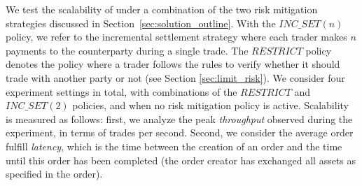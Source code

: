 We test the scalability of \ModelName{} under a combination of the two risk mitigation strategies discussed in Section~\ref{sec:solution_outline}.
With the $ INC\_SET(n) $ policy, we refer to the incremental settlement strategy where each trader makes $ n $ payments to the counterparty during a single trade.
The $ RESTRICT $ policy denotes the policy where a trader follows the \ModelName{} rules to verify whether it should trade with another party or not (see Section \ref{sec:limit_risk}).
We consider four experiment settings in total, with combinations of the $ RESTRICT $ and $ INC\_SET(2) $ policies, and when no risk mitigation policy is active.
Scalability is measured as follows:
first, we analyze the peak \emph{throughput} observed during the experiment, in terms of trades per second.
Second, we consider the average order fulfill \emph{latency}, which is the time between the creation of an order and the time until this order has been completed (the order creator has exchanged all assets as specified in the order).

